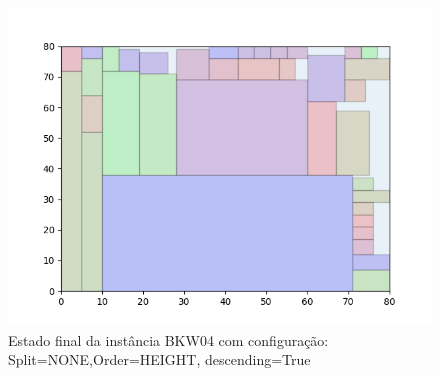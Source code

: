 \begin{figure}[H]
    \centering
    \caption[]{Estado final da instância BKW04 com configuração: Split=NONE,Order=HEIGHT, descending=True}
    \label{fig:bkw04-none-height-true}
    \includegraphics[scale=0.5]{output/figures/bkw/bkw04/none/height/true/00}
\end{figure}
